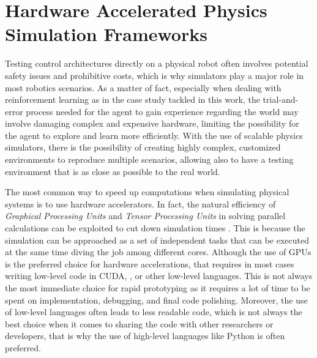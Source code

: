 \chapter{Hardware Accelerated Physics Simulation Frameworks}
\label{chp:back_PhysicsSimulators}


Testing control architectures directly on a physical robot often involves potential safety issues and prohibitive costs, which is why simulators play a major role in most robotics scenarios. As a matter of fact, especially when dealing with reinforcement learning as in the case study tackled in this work, the trial-and-error process needed for the agent to gain experience regarding the world may involve damaging complex and expensive hardware, limiting the possibility for the agent to explore and learn more efficiently. With the use of scalable physics simulators, there is the possibility of creating highly complex, customized environments to reproduce multiple scenarios, allowing also to have a testing environment that is as close as possible to the real world.

The most common way to speed up computations when simulating physical systems is to use hardware accelerators. In fact, the natural efficiency of \textit{Graphical Processing Units} and \textit{Tensor Processing Units} in solving parallel calculations can be exploited to cut down simulation times \citep{liang_gpu-accelerated_2018}. This is because the simulation can be approached as a set of independent tasks that can be executed at the same time diving the job among different cores. Although the use of \ac{GPU}s is the preferred choice for hardware accelerations, that requires in most cases writing low-level code in \ac{CUDA}, \cpp, or other low-level languages. This is not always the most immediate choice for rapid prototyping as it requires a lot of time to be spent on implementation, debugging, and final code polishing. Moreover, the use of low-level languages often leads to less readable code, which is not always the best choice when it comes to sharing the code with other researchers or developers, that is why the use of high-level languages like Python is often preferred.

